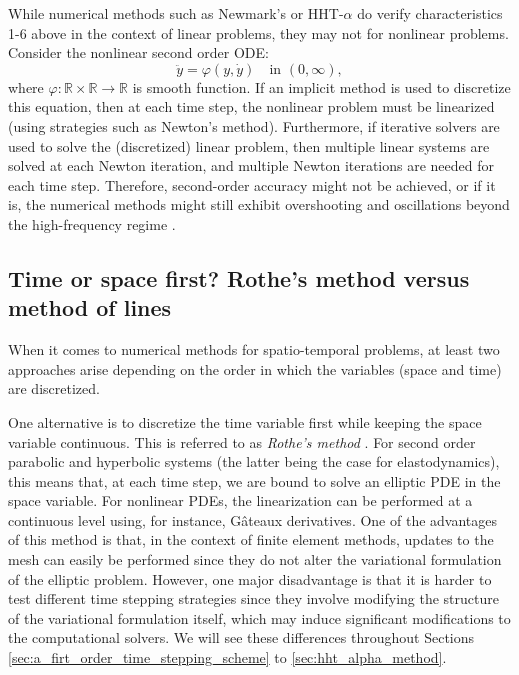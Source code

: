 \documentclass{sfuthesis}
\numberwithin{equation}{section}
\numberwithin{figure}{chapter}
\numberwithin{table}{chapter}
\theoremstyle{definition}
\newcommand{\R}{\mathbb{R}}
\begin{document}
While numerical methods such as Newmark's or HHT-$\alpha$ do verify characteristics 1-6 above in the context of linear problems, they may not for nonlinear problems. Consider the nonlinear second order ODE:
\[
    \ddot{y} = \varphi(y,\dot{y}) \quad \text{in } (0,\infty),
\]
where $\varphi:\R \times \R \to \R$ is smooth function. If an implicit method is used to discretize this equation, then at each time step, the nonlinear problem must be linearized (using strategies such as Newton's method). Furthermore, if iterative solvers are used to solve the (discretized) linear problem, then multiple linear systems are solved at each Newton iteration, and multiple Newton iterations are needed for each time step. Therefore, second-order accuracy might not be achieved, or if it is, the numerical methods might still exhibit overshooting and oscillations beyond the high-frequency regime \cite{ErlicherBonaventuraBursi2002}.


\subsection{Time or space first? Rothe's method versus method of lines}

When it comes to numerical methods for spatio-temporal problems, at least two approaches arise depending on the order in which the variables (space and time) are discretized.

One alternative is to discretize the time variable first while keeping the space variable continuous. This is referred to as \textit{Rothe's method} \cite{Rothe1930}. For second order parabolic and hyperbolic systems (the latter being the case for elastodynamics), this means that, at each time step, we are bound to solve an elliptic PDE in the space variable. For nonlinear PDEs, the linearization can be performed at a continuous level using, for instance, G\^{a}teaux derivatives. One of the advantages of this method is that, in the context of finite element methods, updates to the mesh can easily be performed since they do not alter the variational formulation of the elliptic problem. However, one major disadvantage is that it is harder to test different time stepping strategies since they involve modifying the structure of the variational formulation itself, which may induce significant modifications to the computational solvers. We will see these differences throughout Sections \ref{sec:a_firt_order_time_stepping_scheme} to \ref{sec:hht_alpha_method}.
\end{document}
